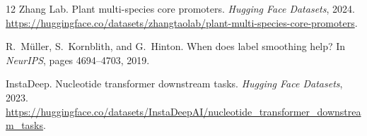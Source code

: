 \documentclass{article}
\begin{document}
\begin{thebibliography}{12}
{Zhang Lab}.
Plant multi-species core promoters.
\emph{Hugging Face Datasets}, 2024.
\url{https://huggingface.co/datasets/zhangtaolab/plant-multi-species-core-promoters}.

R.~M{\"u}ller, S.~Kornblith, and G.~Hinton.
When does label smoothing help?
In \emph{NeurIPS}, pages 4694--4703, 2019.

{InstaDeep}.
Nucleotide transformer downstream tasks.
\emph{Hugging Face Datasets}, 2023.
\url{https://huggingface.co/datasets/InstaDeepAI/nucleotide_transformer_downstream_tasks}.

\end{thebibliography}
\end{document}
